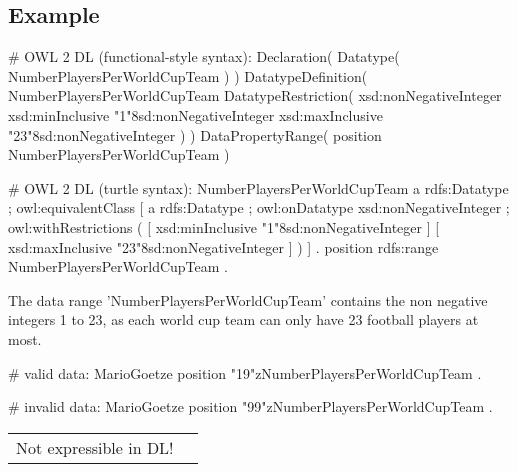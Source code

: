 \documentclass{llncs}
\newcommand{\ms}[1]{\texttt{#1}}
\newenvironment{DL}{
  \vspace{0cm}
	\begin{center}
  \begin{tabular}{r l}

}{
  \end{tabular}
	\end{center}
}
\begin{document}
\subsection{Example}

\begin{ex}
# OWL 2 DL (functional-style syntax):
Declaration( Datatype( NumberPlayersPerWorldCupTeam ) ) 
DatatypeDefinition( 
    NumberPlayersPerWorldCupTeam
    DatatypeRestriction( 
        xsd:nonNegativeInteger 
        xsd:minInclusive "1"^^xsd:nonNegativeInteger 
        xsd:maxInclusive "23"^^xsd:nonNegativeInteger ) )     
DataPropertyRange( position NumberPlayersPerWorldCupTeam ) 
\end{ex}

\begin{ex}
# OWL 2 DL (turtle syntax):
NumberPlayersPerWorldCupTeam
    a rdfs:Datatype ;
    owl:equivalentClass [
        a rdfs:Datatype ;
        owl:onDatatype xsd:nonNegativeInteger ;
        owl:withRestrictions ( 
            [ xsd:minInclusive "1"^^xsd:nonNegativeInteger ]
            [ xsd:maxInclusive "23"^^xsd:nonNegativeInteger ] ) ] .
position rdfs:range NumberPlayersPerWorldCupTeam .
\end{ex}

The data range 'NumberPlayersPerWorldCupTeam' contains the non negative integers 1 to 23, as each world cup team can only have 23 football players at most.

\begin{ex}
# valid data:
MarioGoetze
    position "19"^^:NumberPlayersPerWorldCupTeam .
\end{ex}

\begin{ex}
# invalid data:
MarioGoetze
    position "99"^^:NumberPlayersPerWorldCupTeam .
\end{ex}



\begin{DL}
Not expressible in DL!
\end{DL}
\end{document}
